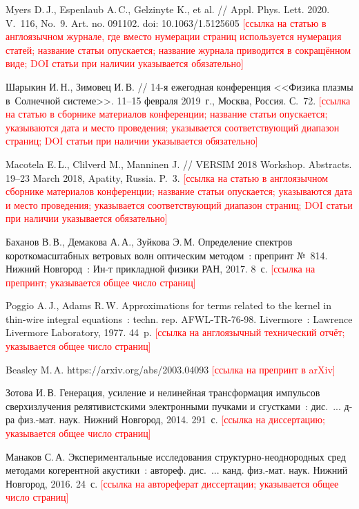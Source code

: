 \documentclass[12pt, a4paper]{article}
\begin{document}
\begin{thebibliography}{99}
Myers D.\,J., Espenlaub A.\,C., Gelzinyte K., et al. // Appl. Phys. Lett. 2020. V.~116, No.~9. Art. no. 091102. doi: 10.1063/1.5125605
\textcolor{red}{[ссылка на статью в англоязычном журнале, где вместо нумерации страниц используется нумерация статей; название статьи опускается; название журнала приводится в сокращённом виде; DOI статьи при наличии указывается обязательно]}

Шарыкин И.\,Н., Зимовец И.\,В. // 14-я ежегодная конференция <<Физика плазмы в~Солнечной системе>>. 11--15 февраля 2019~г., Москва, Россия. С.~72.
\textcolor{red}{[ссылка на статью в сборнике материалов конференции; название статьи опускается; указываются дата и место проведения; указывается соответствующий диапазон страниц; DOI статьи при наличии указывается обязательно]}

Macotela E.\,L., Clilverd M., Manninen J. // VERSIM 2018 Workshop. Abstracts. 19--23 March 2018, Apatity, Russia. P.~3.
\textcolor{red}{[ссылка на статью в англоязычном сборнике материалов конференции; название статьи опускается; указываются дата и место проведения; указывается соответствующий диапазон страниц; DOI статьи при наличии указывается обязательно]}

Баханов В.\,В., Демакова А.\,А., Зуйкова Э.\,М. Определение спектров короткомасштабных ветровых волн оптическим методом~: препринт №~814. Нижний Новгород~: Ин-т прикладной физики РАН, 2017. 8~с.
\textcolor{red}{[ссылка на препринт; указывается общее число страниц]}

Poggio A.\,J., Adams R.\,W. Approximations for terms related to the kernel in thin-wire integral equations~: techn. rep. AFWL-TR-76-98. Livermore~: Lawrence Livermore Laboratory, 1977. 44~p.
\textcolor{red}{[ссылка на англоязычный технический отчёт; указывается общее число страниц]}

Beasley M.\,A. https://arxiv.org/abs/2003.04093
\textcolor{red}{[ссылка на препринт в arXiv]}

Зотова И.\,В. Генерация, усиление и нелинейная трансформация импульсов сверхизлучения релятивистскими электронными пучками и сгустками~: дис.~... д-ра физ.-мат. наук. Нижний Новгород, 2014. 291~с.
\textcolor{red}{[ссылка на диссертацию; указывается общее число страниц]}

Манаков С.\,А. Экспериментальные исследования структурно-неоднородных сред методами когерентной акустики~: автореф. дис.~... канд. физ.-мат. наук. Нижний Новгород, 2016. 24~с.
\textcolor{red}{[ссылка на автореферат диссертации; указывается общее число страниц]}


\end{thebibliography}
\end{document}
